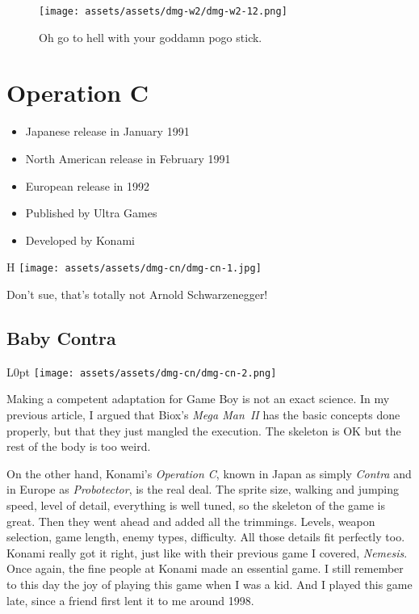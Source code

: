\documentclass{book}
\begin{document}
\begin{figure}[hbt]
\vskip 10pt
\centering \texttt{[image: assets/assets/dmg-w2/dmg-w2-12.png]}\par\pagetwodescription Oh go to hell with your goddamn pogo stick.
\vskip 6pt
\end{figure}


\begingroup \chapter*{Operation C} \endgroup

\begin{itemize} \setlength\itemsep{-0.4em}
\item Japanese release in January 1991
\item North American release in February 1991
\item European release in 1992
\item Published by Ultra Games
\item Developed by Konami
\end{itemize}\noindent

\begin{wrapfigure}{H}{\linewidth}
\vskip 4pt
\centering \texttt{[image: assets/assets/dmg-cn/dmg-cn-1.jpg]}\par\pagetwodescription Don’t sue, that’s totally not Arnold Schwarzenegger!\end{wrapfigure}
\clearpage

\FloatBarrier\needspace{10mm}\section*{Baby Contra}\nopagebreak[4]

\begin{wrapfigure}{L}{0pt} \texttt{[image: assets/assets/dmg-cn/dmg-cn-2.png]}\end{wrapfigure}
Making a competent adaptation for Game Boy is not an exact science. In my previous article, I argued that Biox’s \emph{Mega Man II} has the basic concepts done properly, but that they just mangled the execution. The skeleton is OK but the rest of the body is too weird.

On the other hand, Konami’s \emph{Operation C}, known in Japan as simply \emph{Contra} and in Europe as \emph{Probotector}, is the real deal. The sprite size, walking and jumping speed, level of detail, everything is well tuned, so the skeleton of the game is great. Then they went ahead and added all the trimmings. Levels, weapon selection, game length, enemy types, difficulty. All those details fit perfectly too. Konami really got it right, just like with their previous game I covered, \emph{Nemesis}. Once again, the fine people at Konami made an essential game. I still remember to this day the joy of playing this game when I was a kid. And I played this game late, since a friend first lent it to me around 1998.
\end{document}
